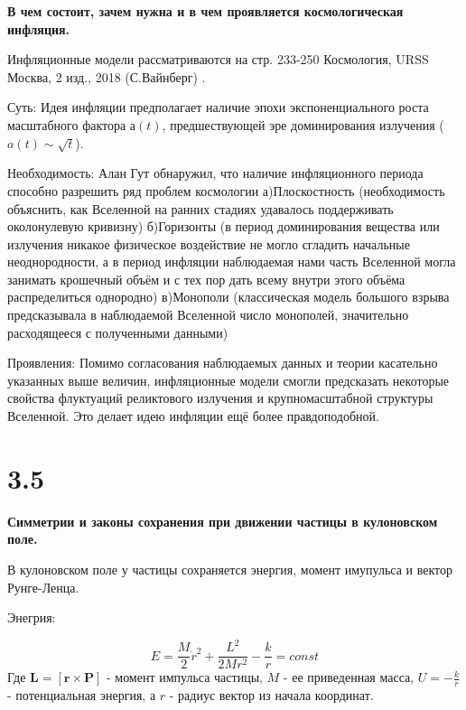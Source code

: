 \documentclass[a4paper,14pt]{article}
\begin{document}
\begin{center}
	\LARGE{\textbf{В чем состоит, зачем нужна и в чем проявляется космологическая инфляция.}}\\
\end{center}

Инфляционные модели рассматриваются на стр. 233-250 Космология, URSS Москва, 2 изд., 2018 (С.Вайнберг) .

Суть:
Идея инфляции предполагает наличие эпохи экспоненциального роста масштабного фактора $а(t)$, предшествующей эре доминирования излучения ($a(t)\sim\sqrt{t}$).

Необходимость:
Алан Гут обнаружил, что наличие инфляционного периода способно разрешить ряд проблем космологии
а)Плоскостность (необходимость объяснить, как Вселенной на ранних стадиях удавалось поддерживать околонулевую кривизну)
б)Горизонты (в период доминирования вещества или излучения никакое физическое воздействие не могло сгладить начальные неоднородности, а в период инфляции наблюдаемая нами часть Вселенной могла занимать крошечный объём и с тех пор дать всему внутри этого объёма распределиться однородно)
в)Монополи (классическая модель большого взрыва предсказывала в наблюдаемой Вселенной число монополей, значительно расходящееся с полученными данными)

Проявления:
Помимо согласования наблюдаемых данных и теории касательно указанных выше величин, инфляционные модели смогли предсказать некоторые свойства флуктуаций реликтового излучения и крупномасштабной структуры Вселенной.
Это делает идею инфляции ещё более правдоподобной.

\section*{3.5}

\begin{center}
	\LARGE{\textbf{Симметрии и законы сохранения при движении частицы в кулоновском поле.}}\\
\end{center}

В кулоновском поле у частицы сохраняется энергия, момент имупульса и вектор Рунге-Ленца. 

Энегрия: 

\begin{equation*}
E = \frac{M}{2} \dot{r}^2 + \frac{L^2}{2Mr^2} - \frac{k}{r} = const
\end{equation*}
Где $\mathbf {L} = [\mathbf r \times \mathbf P ]$ - момент импульса частицы, $M$ - ее приведенная масса, $U = - \frac{k}{r}$ - потенциальная энергия, а $r$ - радиус вектор из начала координат. 
\end{document}
